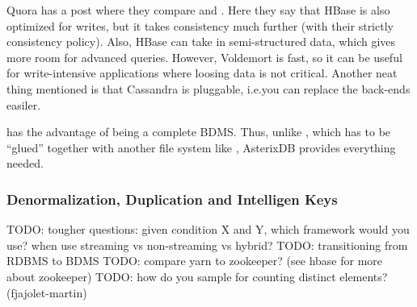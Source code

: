 Quora has a post where they compare  and . 
Here they say that HBase is also optimized for writes, but it takes consistency much further (with their
strictly consistency policy). Also, HBase can take in semi-structured data, which gives
more room for advanced queries. However, Voldemort is fast, so it can be useful
for write-intensive applications where loosing data is not critical. Another neat thing mentioned is that Cassandra is pluggable, i.e.\@ you can replace the 
back-ends easiler.

 has the advantage of being a complete BDMS. Thus, unlike 
, which has to be ``glued'' together with another file system
like , AsterixDB provides everything needed.


\subsubsection{Denormalization, Duplication and Intelligen Keys}\label{sec:DDI}
TODO: tougher questions: given condition X and Y, which framework would you use?
    when use streaming vs non-streaming vs hybrid?
TODO: transitioning from RDBMS to BDMS
TODO:  compare yarn to zookeeper? (see hbase for more about zookeeper)
TODO:  how do you sample for counting distinct elements?
    (fjajolet-martin)

